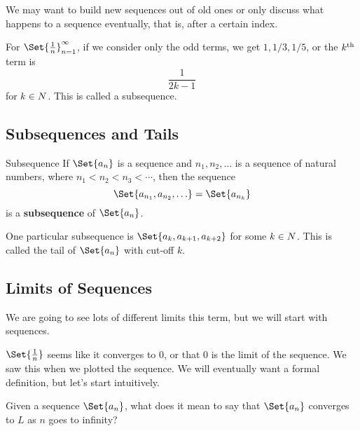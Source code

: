 We may want to build new sequences out of old ones or only discuss what happens to a sequence eventually, that is, after a certain index.
\begin{Example}{}{}
    For $ \Set{\frac{1}{n}}_{n=1}^{\infty} $, if we consider only the odd terms, we get $ 1,1/3,1/5 $, or the $ k\textsuperscript{th} $
    term is
    \[ \frac{1}{2k-1} \]
    for $ k\in\relax{N} $.
    This is called a subsequence.
\end{Example}
\subsection{Subsequences and Tails}
\begin{Definition}{Subsequence}{}
    If $ \Set{a_n} $ is a sequence and $ {n_1,n_2,\ldots} $ is a sequence of natural numbers, where
    $ n_1<n_2<n_3<\cdots $, then the sequence
    \[ \Set{a_{n_1},a_{n_2},\ldots}=\Set{a_{n_k}} \]
    is a \textbf{subsequence} of $ \Set{a_n} $.
\end{Definition}
One particular subsequence is $ \Set{a_k,a_{k+1},a_{k+2}} $ for some $ k\in\relax{N} $.
This is called the tail of $ \Set{a_n} $ with cut-off $ k $.

\subsection{Limits of Sequences}
We are going to see lots of different limits this term, but we will start with sequences.
\begin{Example}{}{}
    $ \Set{\frac{1}{n}} $ seems like it converges to $ 0 $, or that $ 0 $ is the limit of the sequence.
    We saw this when we plotted the sequence. We will eventually want a formal definition, but let's start intuitively.
\end{Example}
Given a sequence $ \Set{a_n} $, what does it mean to say that $ \Set{a_n} $ converges to $ L $
as $ n $ goes to infinity?

